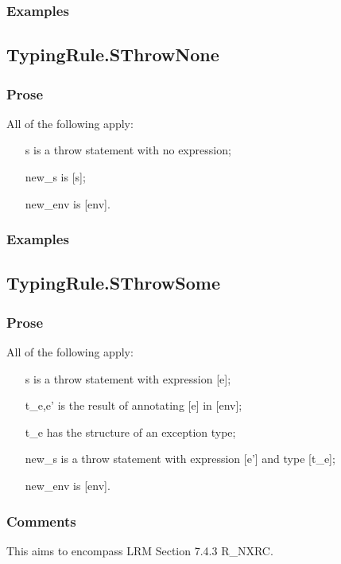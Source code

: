 \documentclass{book}
\begin{document}
    \subsubsection{Examples}

\subsection{TypingRule.SThrowNone}

    \subsubsection{Prose}
    All of the following apply:
   \begin{itemize}
   \item [s] is a throw statement with no expression;
   \item [new\_s] is [s];
   \item [new\_env] is [env].
   \end{itemize}

    \subsubsection{Examples}

\subsection{TypingRule.SThrowSome}

    \subsubsection{Prose}
    All of the following apply:
   \begin{itemize}
   \item [s] is a throw statement with expression [e];
   \item [t\_e,e'] is the result of annotating [e] in [env];
   \item [t\_e] has the structure of an exception type;
   \item [new\_s] is a throw statement with expression [e'] and type [t\_e];
   \item [new\_env] is [env].
   \end{itemize}

    \subsubsection{Comments}
    This aims to encompass LRM Section 7.4.3 R\_NXRC.
\end{document}
